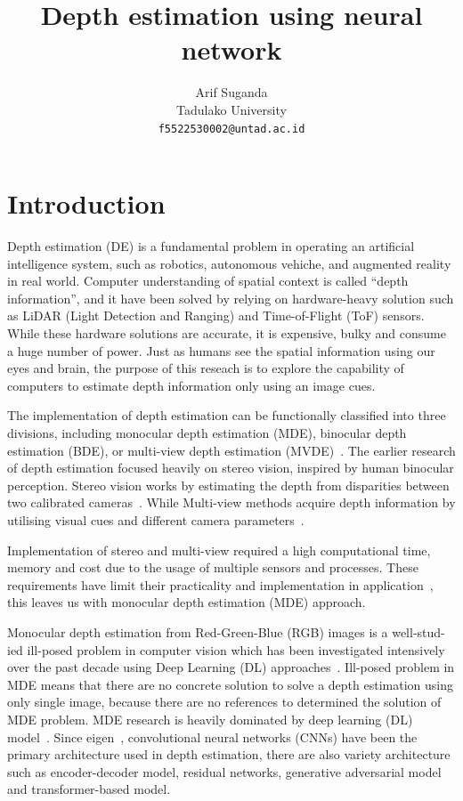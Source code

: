 \documentclass[a4paper,10pt]{article}
\title{Depth estimation using neural network}
\author{Arif Suganda\\
        Tadulako University\\
        \texttt{f5522530002@untad.ac.id}
}
\begin{document}
\maketitle

\section{Introduction}
Depth estimation (DE) is a fundamental problem in operating an artificial intelligence system, such as robotics, autonomous vehiche, and augmented reality in real world.
Computer understanding of spatial context is called ``depth information'', and it have been solved by relying on hardware-heavy solution such as LiDAR (Light Detection and Ranging) and Time-of-Flight (ToF) sensors.
While these hardware solutions are accurate, it is expensive, bulky and consume a huge number of power. 
Just as humans see the spatial information using our eyes and brain, the purpose of this reseach is to explore the capability of computers to estimate depth information only using an image cues.

The implementation of depth estimation can be functionally classified into three divisions, including monocular depth estimation (MDE), binocular depth estimation (BDE), or multi-view depth estimation (MVDE)~\cite{Masoumian2022MDEReview}.
The earlier research of depth estimation focused heavily on stereo vision, inspired by human binocular perception.
Stereo vision works by estimating the depth from disparities between two calibrated cameras~\cite{Zhang2025MDESurvey}.
While Multi-view methods acquire depth information by utilising visual cues and different camera parameters~\cite{Khan2020MDEReview}.

Implementation of stereo and multi-view required a high computational time, memory and cost due to the usage of multiple sensors and processes.
These requirements have limit their practicality and implementation in application~\cite{Khan2020MDEReview,Masoumian2022MDEReview}, this leaves us with monocular depth estimation (MDE) approach.

Monocular depth estimation from Red-Green-Blue (RGB) images is a well-stud-ied ill-posed problem in computer vision which has been investigated intensively over the past decade using Deep Learning (DL) approaches~\cite{Khan2020MDEReview}.
Ill-posed problem in MDE means that there are no concrete solution to solve a depth estimation using only single image, because there are no references to determined the solution of MDE problem.
MDE research is heavily dominated by deep learning (DL) model~\cite{Masoumian2022MDEReview}. Since eigen~\cite{eigen14062283}, convolutional neural networks (CNNs) have been the primary architecture used in depth estimation, there are also variety architecture such as encoder-decoder model, residual networks, generative adversarial model and transformer-based model.
\end{document}
